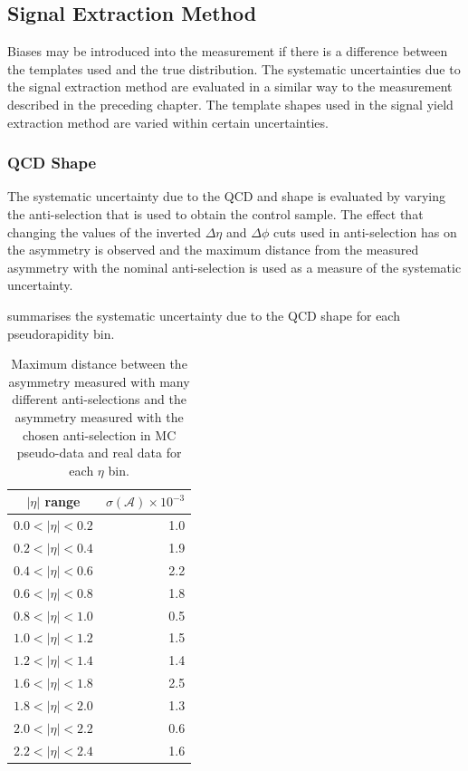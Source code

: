 \subsection{Signal Extraction Method}
Biases may be introduced into the measurement if there is a
difference between the \ETm templates used and the true \ETm distribution. 
The systematic uncertainties due to the signal extraction method are evaluated
in a similar way to the measurement described in the preceding chapter.  The
template shapes used in the signal yield extraction method are varied within
certain uncertainties. 

\subsubsection{QCD \ETm Shape}
The systematic uncertainty due to the {QCD} and \gjet \ETm shape is evaluated
by varying the anti-selection that is used to obtain the control sample. The
effect that changing the values of the inverted $\Delta\eta$ and $\Delta\phi$
cuts used in anti-selection has on the asymmetry is observed and the maximum
distance from the measured asymmetry with the nominal anti-selection is used as a
measure of the systematic uncertainty.

 summarises the systematic uncertainty due to the
{QCD} \ETm shape for each pseudorapidity bin.

\begin{table}[htbp]
\begin{center}
\begin{tabular}{cr}
\toprule
$|\eta|$ range  & $\sigma(\mathcal{A}) \times 10^{-3}$\\
\midrule
$0.0<|\eta|<0.2$ & 1.0\\
$0.2<|\eta|<0.4$ & 1.9\\
$0.4<|\eta|<0.6$ & 2.2\\
$0.6<|\eta|<0.8$ & 1.8\\
$0.8<|\eta|<1.0$ & 0.5\\
$1.0<|\eta|<1.2$ & 1.5\\
$1.2<|\eta|<1.4$ & 1.4\\
$1.6<|\eta|<1.8$ & 2.5\\
$1.8<|\eta|<2.0$ & 1.3\\
$2.0<|\eta|<2.2$ & 0.6\\
$2.2<|\eta|<2.4$ & 1.6\\
\bottomrule
\end{tabular}
\caption[Maximum distance between the asymmetry measured with many different
anti-selections and the asymmetry measured with the chosen anti-selection in MC
pseudo-data and real data.]{Maximum distance between the asymmetry measured with
many different anti-selections and the asymmetry measured with the chosen
anti-selection in MC pseudo-data and real data for each $\eta$
bin\cite{bendavid2011electron}.}

\label{tab:updatedsystQCD}
\end{center}
\end{table}

